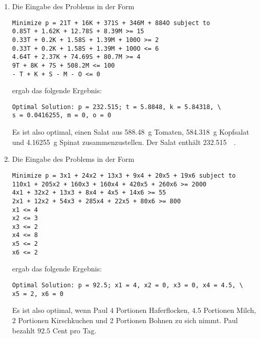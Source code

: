 \documentclass[a4paper]{scrartcl}
\begin{document}
\begin{enumerate}[label=\bfseries\arabic*.]
\begin{enumerate}
            \item
                Die Eingabe des Problems in der Form
                \begin{verbatim}
Minimize p = 21T + 16K + 371S + 346M + 884O subject to
0.85T + 1.62K + 12.78S + 8.39M >= 15
0.33T + 0.2K + 1.58S + 1.39M + 100O >= 2
0.33T + 0.2K + 1.58S + 1.39M + 100O <= 6
4.64T + 2.37K + 74.69S + 80.7M >= 4
9T + 8K + 7S + 508.2M <= 100
- T + K + S - M - O <= 0 \end{verbatim}
                ergab das folgende Ergebnis:
                \begin{verbatim}
Optimal Solution: p = 232.515; t = 5.8848, k = 5.84318, \
s = 0.0416255, m = 0, o = 0 \end{verbatim}
                Es ist also optimal, einen Salat aus \SI{588,48}{\gram} Tomaten,
                \SI{584,318}{\gram} Kopfsalat und \SI{4,16255}{\gram} Spinat
                zusammenzustellen.
                Der Salat enthält \SI{232,515}{\kilo\calorie}.

            \item
                Die Eingabe des Problems in der Form
                \begin{verbatim}
Minimize p = 3x1 + 24x2 + 13x3 + 9x4 + 20x5 + 19x6 subject to
110x1 + 205x2 + 160x3 + 160x4 + 420x5 + 260x6 >= 2000
4x1 + 32x2 + 13x3 + 8x4 + 4x5 + 14x6 >= 55
2x1 + 12x2 + 54x3 + 285x4 + 22x5 + 80x6 >= 800
x1 <= 4
x2 <= 3
x3 <= 2
x4 <= 8
x5 <= 2
x6 <= 2 \end{verbatim}
                ergab das folgende Ergebnis:
                \begin{verbatim}
Optimal Solution: p = 92.5; x1 = 4, x2 = 0, x3 = 0, x4 = 4.5, \
x5 = 2, x6 = 0 \end{verbatim}
                Es ist also optimal, wenn Paul $4$ Portionen Haferflocken,
                $4.5$ Portionen Milch, 2 Portionen Kirschkuchen und 2 Portionen
                Bohnen zu sich nimmt.
                Paul bezahlt $92.5$ Cent pro Tag.

        \end{enumerate}

\end{enumerate}
\end{document}
